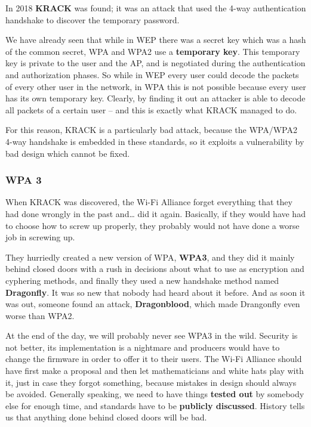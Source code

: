 In 2018 \textbf{KRACK} was found; it was an attack that used the 4-way authentication handshake to discover the temporary password. 
 
We have already seen that while in WEP there was a secret key which was a hash of the common secret, WPA and WPA2 use a \textbf{temporary key}. This temporary key is private to the user and the AP, and is negotiated during the authentication and authorization phases. So while in WEP every user could decode the packets of every other user in the network, in WPA this is not possible because every user has its own temporary key. Clearly, by finding it out an attacker is able to decode all packets of a certain user – and this is exactly what KRACK managed to do.
 
For this reason, KRACK is a particularly bad attack, because the WPA/WPA2 4-way handshake is embedded in these standards, so it exploits a vulnerability by bad design which cannot be fixed.


\subsubsection*{WPA 3}
When KRACK was discovered, the Wi-Fi Alliance forget everything that they had done wrongly in the past and… did it again. Basically, if they would have had to choose how to screw up properly, they probably would not have done a worse job in screwing up.

They hurriedly created a new version of WPA, \textbf{WPA3}, and they did it mainly behind closed doors with a rush in decisions about what to use as encryption and cyphering methods, and finally they used a new handshake method named \textbf{Dragonfly}. It was so new that nobody had heard about it before. And as soon it was out, someone found an attack, \textbf{Dragonblood}, which made Drangonfly even worse than WPA2.

At the end of the day, we will probably never see WPA3 in the wild. Security is not better, its implementation is a nightmare and producers would have to change the firmware in order to offer it to their users. The Wi-Fi Alliance should have first make a proposal and then let mathematicians and white hats play with it, just in case they forgot something, because mistakes in design should always be avoided. Generally speaking, we need to have things \textbf{tested out} by somebody else for enough time, and standards have to be \textbf{publicly discussed}. History tells us that anything done behind closed doors will be bad.